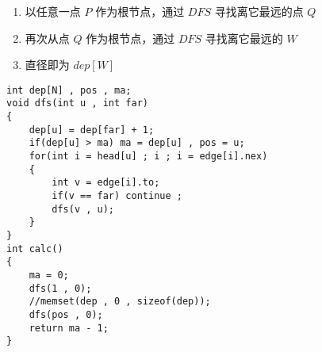 \documentclass[
]{article}
\author{}
\date{}
\begin{document}
\begin{enumerate}
\def\labelenumi{\arabic{enumi}.}
\item
  以任意一点 \(P\) 作为根节点，通过 \(DFS\) 寻找离它最远的点 \(Q\)
\item
  再次从点 \(Q\) 作为根节点，通过 \(DFS\) 寻找离它最远的 \(W\)
\item
  直径即为 \(dep[W]\)
\end{enumerate}

\begin{verbatim}
int dep[N] , pos , ma;
void dfs(int u , int far)
{
	dep[u] = dep[far] + 1;
	if(dep[u] > ma) ma = dep[u] , pos = u;
	for(int i = head[u] ; i ; i = edge[i].nex)
	{
		int v = edge[i].to;
		if(v == far) continue ;
		dfs(v , u);
	}
}
int calc()
{
	ma = 0;
	dfs(1 , 0); 
	//memset(dep , 0 , sizeof(dep)); 
	dfs(pos , 0);
	return ma - 1;
}
\end{verbatim}
\end{document}
